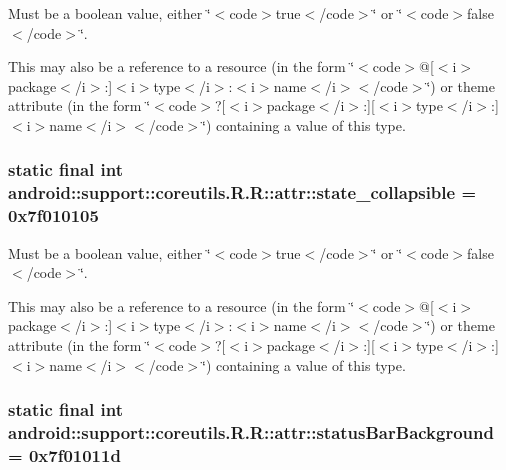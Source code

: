Must be a boolean value, either \char`\"{}$<$code$>$true$<$/code$>$\char`\"{} or \char`\"{}$<$code$>$false$<$/code$>$\char`\"{}. 

This may also be a reference to a resource (in the form \char`\"{}$<$code$>$@\mbox{[}$<$i$>$package$<$/i$>$:\mbox{]}$<$i$>$type$<$/i$>$:$<$i$>$name$<$/i$>$$<$/code$>$\char`\"{}) or theme attribute (in the form \char`\"{}$<$code$>$?\mbox{[}$<$i$>$package$<$/i$>$:\mbox{]}\mbox{[}$<$i$>$type$<$/i$>$:\mbox{]}$<$i$>$name$<$/i$>$$<$/code$>$\char`\"{}) containing a value of this type. \hypertarget{classandroid_1_1support_1_1coreutils_1_1_r_1_1attr_d60d2728fe34e2af4bcfc67e49d1407d}{
\subsubsection[{state\_\-collapsible}]{\setlength{\rightskip}{0pt plus 5cm}static final int android::support::coreutils.R.R::attr::state\_\-collapsible = 0x7f010105}}
\label{classandroid_1_1support_1_1coreutils_1_1_r_1_1attr_d60d2728fe34e2af4bcfc67e49d1407d}


Must be a boolean value, either \char`\"{}$<$code$>$true$<$/code$>$\char`\"{} or \char`\"{}$<$code$>$false$<$/code$>$\char`\"{}. 

This may also be a reference to a resource (in the form \char`\"{}$<$code$>$@\mbox{[}$<$i$>$package$<$/i$>$:\mbox{]}$<$i$>$type$<$/i$>$:$<$i$>$name$<$/i$>$$<$/code$>$\char`\"{}) or theme attribute (in the form \char`\"{}$<$code$>$?\mbox{[}$<$i$>$package$<$/i$>$:\mbox{]}\mbox{[}$<$i$>$type$<$/i$>$:\mbox{]}$<$i$>$name$<$/i$>$$<$/code$>$\char`\"{}) containing a value of this type. \hypertarget{classandroid_1_1support_1_1coreutils_1_1_r_1_1attr_7af97448475ee91f5769a28c2de7ab8c}{
\subsubsection[{statusBarBackground}]{\setlength{\rightskip}{0pt plus 5cm}static final int android::support::coreutils.R.R::attr::statusBarBackground = 0x7f01011d}}
\label{classandroid_1_1support_1_1coreutils_1_1_r_1_1attr_7af97448475ee91f5769a28c2de7ab8c}



